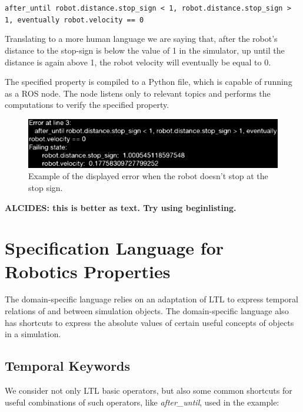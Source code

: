 \documentclass[runningheads]{llncs}
\begin{document}
\vspace{3mm}

\texttt{after\_until robot.distance.stop\_sign < 1, robot.distance.stop\_sign > 1, eventually robot.velocity == 0}

\vspace{3mm}

Translating to a more human language we are saying that, after the robot's distance to the stop-sign is below the value of 1 in the simulator, up until the distance is again above 1, the robot velocity will eventually be equal to 0.

The specified property is compiled to a Python file, which is capable of running as a ROS node. The node listens only to relevant topics and performs the computations to verify the specified property.

\begin{figure}
\includegraphics[width=\textwidth]{error.eps}
\caption{Example of the displayed error when the robot doesn't stop at the stop sign.} \label{fig1}
\end{figure}

\textbf{ALCIDES: this is better as text. Try using begin{listing}.}

\section{Specification Language for Robotics Properties}

The domain-specific language relies on an adaptation of LTL to express temporal relations of and between simulation objects. The domain-specific language also has shortcuts to express the absolute values of certain useful concepts of objects in a simulation.

\subsection{Temporal Keywords}

We consider not only LTL basic operators, but also some common shortcuts for useful combinations of such operators, like \textit{after\_until}, used in the example:
\end{document}
